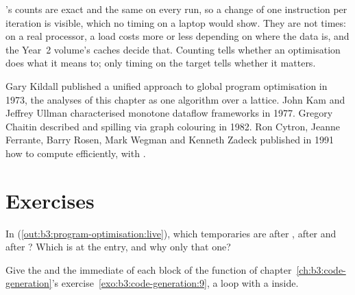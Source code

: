 \begin{inpractice}
's counts are exact and the same on every run, so a change of one instruction per iteration is visible, which no timing on a laptop would show. They are not times: on a real processor, a load costs more or less depending on where the data is, and the Year~2 volume's caches decide that. Counting tells whether an optimisation does what it means to; only timing on the target tells whether it matters.
\end{inpractice}

\begin{history}
Gary Kildall published a unified approach to global program optimisation in 1973, the analyses of this chapter as one algorithm over a lattice. %
John Kam and Jeffrey Ullman characterised monotone dataflow frameworks in 1977. %
Gregory Chaitin described  and spilling via graph colouring in 1982. %
Ron Cytron, Jeanne Ferrante, Barry Rosen, Mark Wegman and Kenneth Zadeck published in 1991 how to compute  efficiently, with . %
\end{history}

\section{Exercises}\label{sec:b3:program-optimisation:exercises}

\begin{exercise}[$\star$]\label{exo:b3:program-optimisation:1}
In  (\cref{out:b3:program-optimisation:live}), which temporaries are  after , after  and after ? Which is  at the entry, and why only that one?
\end{exercise}

\begin{exercise}[$\star$]\label{exo:b3:program-optimisation:2}
Give the  and the immediate  of each block of the function  of chapter~\ref{ch:b3:code-generation}'s exercise~\ref{exo:b3:code-generation:9}, a  loop with a  inside.
\end{exercise}

